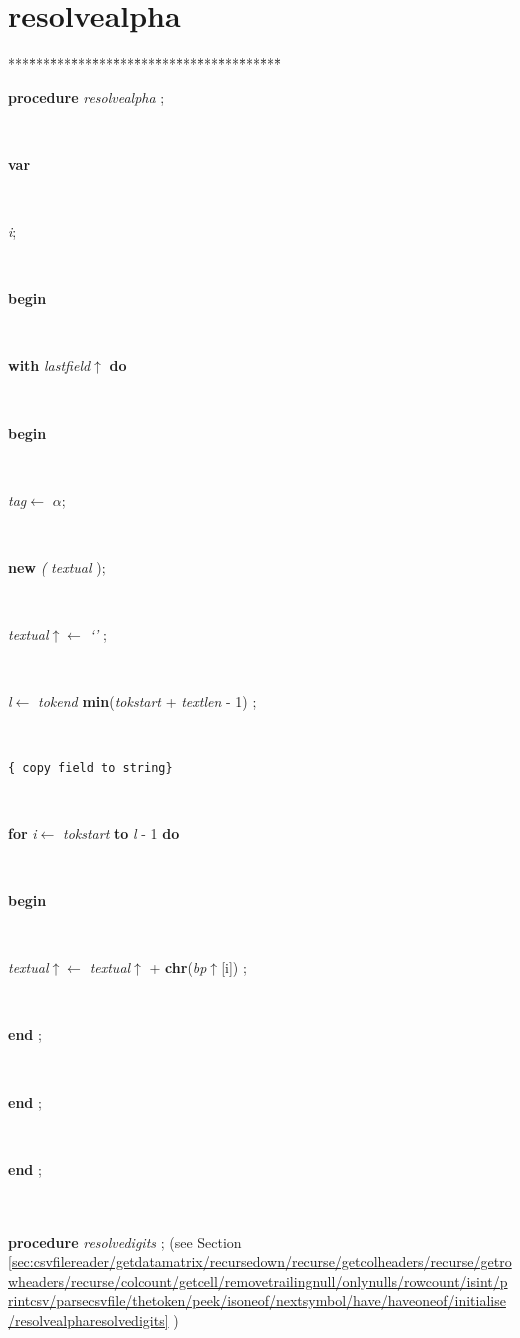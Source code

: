 \section{resolvealpha}\label{sec:csvfilereader/getdatamatrix/recursedown/recurse/getcolheaders/recurse/getrowheaders/recurse/colcount/getcell/removetrailingnull/onlynulls/rowcount/isint/printcsv/parsecsvfile/thetoken/peek/isoneof/nextsymbol/have/haveoneof/initialiseresolvealpha}

\begin{tabbing}
***\=***\=***\=***\=***\=***\=***\=***\=***\=***\=***\=***\=***\=\kill
\parbox{14cm}{\textsf{\textbf{procedure}  \textit{resolvealpha} ;}}\\
\+\parbox{14cm}{\textsf{\textbf{var} }}\\
\parbox{14cm}{\textsf{\textit{i}}; }\\
\-\<\+\parbox{14cm}{\textsf{\textbf{begin} }}\\
\+\parbox{14cm}{\textsf {\textbf {with } \textsf{\textit{lastfield}$\uparrow$\textit{}} \textbf{ do } }}\\
\<\parbox{14cm}{\textsf{\textbf{begin} }}\\
\parbox{14cm}{\textsf{\textit{tag}$\leftarrow$ \textit{$\alpha$}}; }\\
\parbox{14cm}{\textsf{\textbf{new} \textit{(} \textit{textual} );}}\\
\parbox{14cm}{\textsf{\textit{textual}$\uparrow$\textit{}$\leftarrow$ \textit{\textrm{\textup { `' } }}}; }\\
\parbox{14cm}{\textsf{\textit{l}$\leftarrow$ \textit{tokend}  \textbf{min}(\textit{tokstart} + \textit{textlen} - 1) }; }\\
\parbox{14cm}{\texttt{\small{\{ copy field to string\}}}}\\
\+\parbox{14cm}{\textsf {\textbf {for } \textsf{\textit{i}$\leftarrow$ \textit{tokstart}} \textbf{ to } \textsf{\textit{l} - 1} \textbf{ do } }}\\
\<\parbox{14cm}{\textsf{\textbf{begin} }}\\
\parbox{14cm}{\textsf{\textit{textual}$\uparrow$\textit{}$\leftarrow$ \textit{textual}$\uparrow$ +  \textbf{chr}(\textit{bp}$\uparrow$\textit{}[i]) }; }\\
\<\-\parbox{14cm}{\textsf{\textbf{end} ;}}\\
\<\-\parbox{14cm}{\textsf{\textbf{end} ;}}\\
\<\-\parbox{14cm}{\textsf{\textbf{end} ;}}\\
\\
\+\textsf{\textbf{procedure}  \textit{resolvedigits} ;} (see Section \ref{sec:csvfilereader/getdatamatrix/recursedown/recurse/getcolheaders/recurse/getrowheaders/recurse/colcount/getcell/removetrailingnull/onlynulls/rowcount/isint/printcsv/parsecsvfile/thetoken/peek/isoneof/nextsymbol/have/haveoneof/initialise/resolvealpharesolvedigits} )\\
\end{tabbing}
